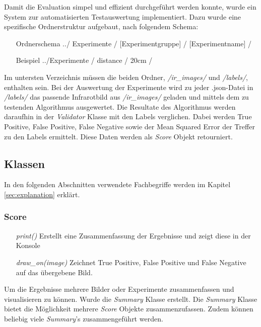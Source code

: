 Damit die Evaluation simpel und effizient durchgeführt werden konnte, wurde ein System zur automatisierten Testauswertung implementiert. Dazu wurde eine spezifische Ordnerstruktur aufgebaut, nach folgendem Schema:

\begin{itemize}[leftmargin=4cm, align=left, labelsep=*, labelwidth=*]
	\item[Ordnerschema] ../ Experimente / [Experimentgruppe] / [Experimentname] /
	\item[Beispiel] ../Experimente / distance / 20cm / 
\end{itemize}

\noindent
Im untersten Verzeichnis müssen die beiden Ordner, \textit{/ir\_images/} und \textit{/labels/}, enthalten sein. Bei der Auswertung der Experimente wird zu jeder .json-Datei in \textit{/labels/} das passende Infrarotbild aus \textit{/ir\_images/} geladen und mittels dem zu testenden Algorithmus ausgewertet. Die Resultate des Algorithmus werden daraufhin in der \textit{Validator} Klasse mit den Labels verglichen. Dabei werden True Positive, False Positive, False Negative sowie der Mean Squared Error der Treffer zu den Labels ermittelt. Diese Daten werden als \textit{Score} Objekt retourniert.\\

\subsection{Klassen}

In den folgenden Abschnitten verwendete Fachbegriffe werden im Kapitel \ref{sec:explanation} erklärt.

\subsubsection{Score}

\begin{itemize}[leftmargin=*,labelindent=3cm, labelsep=1cm]
	\item[\textit{print()}] Erstellt eine Zusammenfassung der Ergebnisse und zeigt diese in der Konsole
	\item[\textit{draw\_on(image)}] Zeichnet True Positive, False Positive und False Negative auf das übergebene Bild.
\end{itemize}

\noindent
Um die Ergebnisse mehrere Bilder oder Experimente zusammenfassen und visualisieren zu können. Wurde die \textit{Summary} Klasse erstellt. Die \textit{Summary} Klasse bietet die Möglichkeit mehrere \textit{Score} Objekte zusammenzufassen. Zudem können beliebig viele \textit{Summary}'s zusammengeführt werden.

